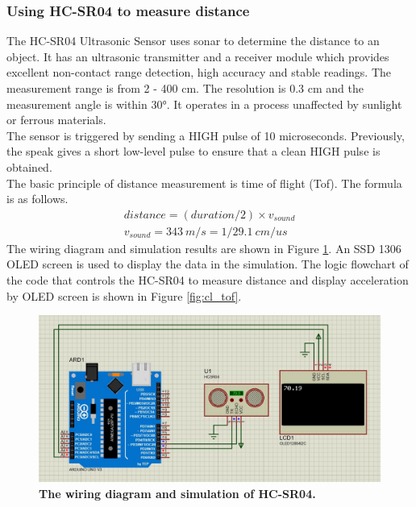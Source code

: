 \subsubsection{Using HC-SR04 to measure distance}
The HC-SR04 Ultrasonic Sensor uses sonar to determine the distance to an object. It has an ultrasonic 
transmitter and a receiver module which provides excellent non-contact range detection, high accuracy and 
stable readings. The measurement range is from 2 - 400 cm. The resolution is 0.3 cm and the measurement angle 
is within 30°. It operates in a process unaffected by sunlight or ferrous materials. \\
The sensor is triggered by sending a HIGH pulse of 10 microseconds. Previously, the speak gives a short 
low-level pulse to ensure that a clean HIGH pulse is obtained. \\
The basic principle of distance measurement is time of flight (Tof). The formula is as follows.
\begin{align}
    distance = (duration/2) \times v_{sound} \\
    v_{sound} = 343\ m/s = 1/29.1\ cm/us \nonumber
\end{align}
\noindent The wiring diagram and simulation results are shown in Figure \ref{fig:tof}. An SSD 1306 OLED screen 
is used to display the data in the simulation. The logic flowchart of the code that controls the HC-SR04 to measure 
distance and display acceleration by OLED screen is shown in Figure \ref{fig:cl_tof}.
\begin{figure}[H] %
    \centering %
    \captionsetup{labelsep=colon}
    \includegraphics[width=0.8\linewidth]{Image/Design/tof_circuit.jpg}
    \caption[The wiring diagram and simulation of HC-SR04]
    {\centering \textbf{The wiring diagram and simulation of HC-SR04.}}
    \label{fig:tof}
\end{figure}
